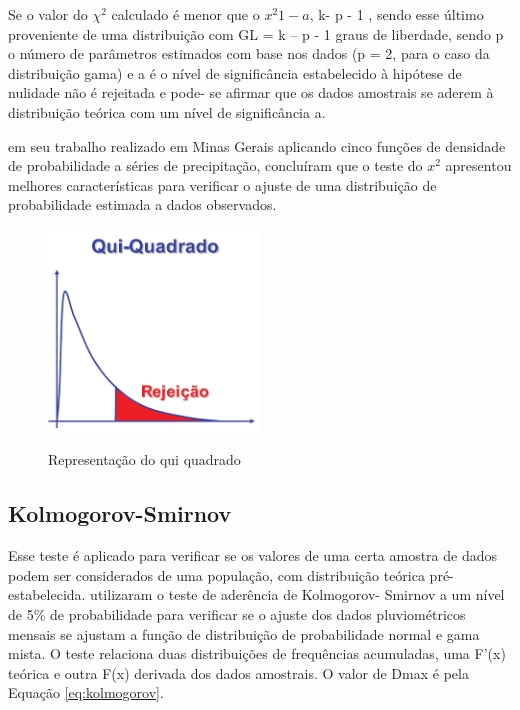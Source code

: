 Se o valor do $\chi^2$  calculado é menor que o $x^2 1 - a$, k- p - 1 , sendo esse último proveniente de uma distribuição com GL = k – p - 1 graus de liberdade, sendo p o número de parâmetros estimados com base nos dados (p = 2, para o caso da distribuição gama) e a é o nível de significância estabelecido à hipótese de nulidade não é rejeitada e pode- se afirmar que os dados amostrais se aderem à distribuição teórica com um nível de significância a.

 em seu trabalho realizado em Minas Gerais aplicando cinco funções de densidade de probabilidade a séries de precipitação, concluíram que o teste do $x^2$  apresentou melhores características para verificar o ajuste de uma distribuição de probabilidade estimada a dados observados.

\begin{figure}[h]
    \caption{Representação do qui quadrado}
    \centering
    \includegraphics[width=0.5\textwidth]{Textuais/Figuras/qui-quadrado.pdf}
    \label{fig:qui-quadrado}
\end{figure}

\subsection{Kolmogorov-Smirnov}

Esse teste é aplicado para verificar se os valores de uma certa amostra de dados podem ser considerados de uma população, com distribuição teórica pré-estabelecida.
 utilizaram o teste de aderência de Kolmogorov- Smirnov a um nível de 5\% de probabilidade para verificar se o ajuste dos dados pluviométricos mensais se ajustam a função de distribuição de probabilidade normal e gama mista. O teste relaciona duas distribuições de frequências acumuladas, uma F’(x) teórica e outra F(x) derivada dos dados amostrais. O valor de Dmax é pela Equação \ref{eq:kolmogorov}.


